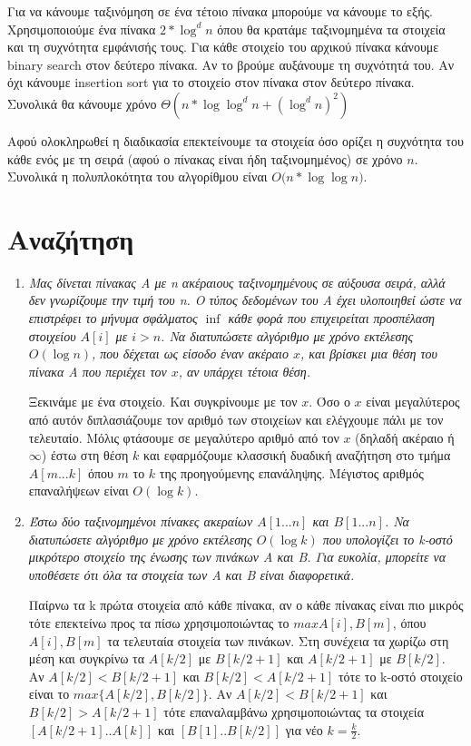 Για να κάνουμε ταξινόμηση σε ένα τέτοιο πίνακα μπορούμε να κάνουμε το εξής.
Χρησιμοποιούμε ένα πίνακα $2*\log^d{n}$ όπου θα κρατάμε ταξινομημένα τα
στοιχεία και τη συχνότητα εμφάνισής τους. Για κάθε στοιχείο του αρχικού πίνακα
κάνουμε binary search στον δεύτερο πίνακα. Αν το βρούμε αυξάνουμε τη συχνότητά
του. Αν όχι κάνουμε insertion sort για το στοιχείο στον πίνακα στον δεύτερο
πίνακα. Συνολικά θα κάνουμε χρόνο $\Theta{(n*\log{\log^d{n}}+(\log^d{n})^2)}$

Αφού ολοκληρωθεί η διαδικασία επεκτείνουμε τα στοιχεία όσο ορίζει η συχνότητα
του κάθε ενός με τη σειρά (αφού ο πίνακας είναι ήδη ταξινομημένος) σε χρόνο
$n$. Συνολικά η πολυπλοκότητα του αλγορίθμου είναι $O(n*\log{\log{n})}$.

\section{Αναζήτηση}
\begin{enumerate}
    \item \textit{Μας δίνεται πίνακας Α με n ακέραιους ταξινομημένους σε αύξουσα
            σειρά, αλλά \emph{δεν γνωρίζουμε την τιμή του n}. Ο τύπος δεδομένων του Α έχει
            υλοποιηθεί ώστε να επιστρέφει το μήνυμα σφάλματος $\inf$ κάθε φορά που
            επιχειρείται προσπέλαση στοιχείου $A[i]$ με $i > n$. Να διατυπώσετε αλγόριθμο
            με χρόνο εκτέλεσης $O(\log{n})$, που δέχεται ως είσοδο έναν ακέραιο $x$, και
        βρίσκει μια θέση του πίνακα Α που περιέχει τον $x$, αν υπάρχει τέτοια θέση.}

        Ξεκινάμε με ένα στοιχείο. Και συγκρίνουμε με τον $x$. Όσο ο $x$ είναι
        μεγαλύτερος από αυτόν διπλασιάζουμε τον αριθμό των στοιχείων και ελέγχουμε
        πάλι με τον τελευταίο. Μόλις φτάσουμε σε μεγαλύτερο αριθμό από τον $x$
        (δηλαδή ακέραιο ή $\infty$) έστω στη θέση $k$ και εφαρμόζουμε κλασσική δυαδική αναζήτηση στο τμήμα $A[m...k]$
        όπου $m$ το $k$ της προηγούμενης επανάληψης. 
        Μέγιστος αριθμός επαναλήψεων είναι $O(\log{k})$.
    \item \textit{Έστω δύο ταξινομημένοι πίνακες ακεραίων $A[1...n]$ και
            $B[1...n]$. Να διατυπώσετε αλγόριθμο με χρόνο εκτέλεσης $O(\log{k})$ που
            υπολογίζει το k-οστό μικρότερο στοιχείο της ένωσης των πινάκων Α και Β. Για
            ευκολία, μπορείτε να υποθέσετε ότι όλα τα στοιχεία των Α και Β είναι
        διαφορετικά.}

        Παίρνω τα k πρώτα στοιχεία από κάθε πίνακα, αν ο κάθε πίνακας είναι πιο μικρός
        τότε επεκτείνω προς τα πίσω χρησιμοποιώντας το $max{A[i],B[m]}$, όπου
        $A[i],B[m]$ τα τελευταία στοιχεία των πινάκων. Στη συνέχεια τα χωρίζω στη μέση και
        συγκρίνω τα $A[k/2]$ με $B[k/2+1]$ και $A[k/2+1]$ με $B[k/2]$. Αν
        $A[k/2]<B[k/2+1]$ και $B[k/2]<A[k/2+1]$ τότε το k-οστό στοιχείο είναι το
        $max\{A[k/2],B[k/2]\}$. Αν $A[k/2]<B[k/2+1]$ και $B[k/2]>A[k/2+1]$ τότε
        επαναλαμβάνω χρησιμοποιώντας τα στοιχεία $[A[k/2+1]..A[k]]$ και
        $[B[1]..B[k/2]]$ για νέο $k=\frac{k}{2}$.
\end{enumerate}

